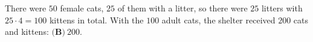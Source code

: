There were $50$ female cats, $25$ of them with a litter, so there were $25$ litters with $25\cdot4=100$ kittens in total. With the $100$ adult cats, the shelter received $200$ cats and kittens: $\boxed{\textbf{(B)}\ 200}$.
